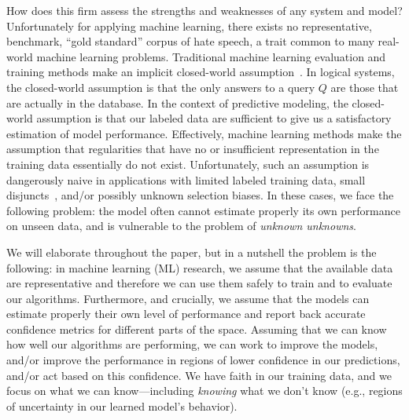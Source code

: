How does this firm assess the strengths and weaknesses of any system
and model?  Unfortunately for applying machine learning, there exists 
no representative, benchmark, ``gold standard'' corpus of hate speech, 
a trait common to many real-world machine learning problems.
Traditional machine learning evaluation and training
methods make an implicit closed-world
assumption~\cite{Reiter77closedworld}. In logical systems, the
closed-world assumption is that the only answers to a query $Q$ are those
that are actually in the database. In the context of predictive
modeling, the closed-world assumption is that our labeled 
data are sufficient to give us a satisfactory estimation of
model performance. Effectively, machine learning methods 
make the assumption that regularities that have no or insufficient
representation in the training data essentially do not exist. 
Unfortunately, such an assumption is dangerously naive 
in applications with limited labeled training
data, small disjuncts~\cite{weiss10disjunct}, and/or possibly unknown
selection biases. In these cases, we face the following problem: 
the model often cannot estimate properly
its own performance on unseen data, and is vulnerable to the problem
of \emph{unknown unknowns}.

We will elaborate throughout the paper, but in a nutshell the problem is the following: in machine learning (ML) research, we assume that the available data are representative and therefore we can use them safely to train and to evaluate our algorithms. Furthermore, and crucially, we assume that the models can estimate properly their own level of performance and report back accurate confidence metrics for different parts of the space. Assuming that we can know how well our algorithms are performing, we can work to improve the models, and/or improve the performance in regions of lower confidence in our predictions, and/or act based on this confidence.  We have faith in our training data, and we focus on what we can know---including \emph{knowing} what we don't know (e.g., regions of uncertainty in our learned model's behavior).

